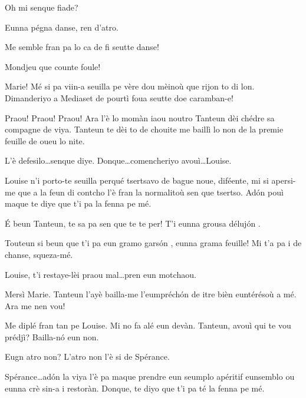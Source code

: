 \begin{drama}
\Alicespeaks{} Oh mi senque fiade?

\Tanteunspeaks Eunna pégna danse, ren d'atro.

\Sperancespeaks Me semble fran pa lo ca de fi seutte danse!

\Tanteunspeaks Mondjeu que counte foule!


\Alicespeaks Marie! Mé si pa viin-a seuilla pe vère dou mèinoù que rijon to di lon. Dimanderiyo a Mediaset de pourtì foua seutte doe caramban-e!

\Mariespeaks Praou! Praou! Praou! Ara l'è lo mo\-màn iaou noutro Tanteun dèi chédre sa compagne de viya. Tanteun te dèi to de chouite me baillì lo non de la premie feuille de oueu lo nite.

\Tanteunspeaks{} L'è defesilo\ldots senque diye. Donque\ldots comencheriyo avouì\ldots Louise.


\Tanteunspeaks Louise n'i porto-te seuilla perqué tsertsavo de bague noue, diféente, mi si apersi-me que a la feun di contcho l'è fran la normalitoù sen que tsertso. Ad\'on pouì maque te diye que t'i pa la fenna pe mé.

\Louisespeaks {} \'E beun Tanteun, te sa pa sen que te te per! T'i eunna grousa déluj\'on .

\Tanteunspeaks Touteun si beun que t'i pa eun gramo gars\'on , eunna grama feuille! Mi t'a pa i de chanse, squeza-mé.

\Mariespeaks Louise, t’i restaye-lèi praou mal\ldots pren eun motchaou.


\Louisespeaks Mersì Marie. Tanteun l’ayè bailla-me l’eumpréch\'on de itre bièn euntérésoù a mé. Ara me nen vou!


\Mariespeaks Me diplé fran tan pe Louise. Mi no fa alé eun devàn. Tanteun, avouì qui te vou prédjì? Bailla-n\'o eun non.

\Tanteunspeaks Eugn atro non? L'atro non l'è si de Spérance.


\Tanteunspeaks Spérance\ldots ad\'on la viya l'è pa maque prendre eun seumplo apéritif eunsemblo ou eunna crè sin-a i restoràn. Donque, te diyo que t'i pa té la fenna pe mé.


\end{drama}
